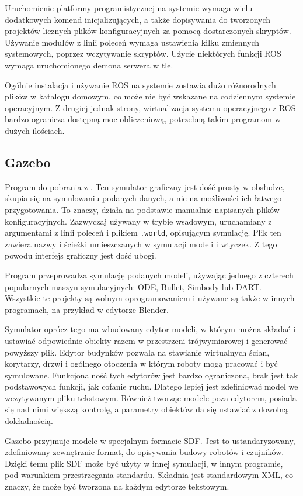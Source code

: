 	Uruchomienie platformy programistycznej na systemie wymaga wielu dodatkowych komend inicjalizujących, 
	a także dopisywania do tworzonych projektów licznych plików konfiguracyjnych za pomocą dostarczonych skryptów.
	Używanie modułów z linii poleceń wymaga ustawienia kilku zmiennych systemowych, poprzez wczytywanie skryptów.
	Użycie niektórych funkcji ROS wymaga uruchomionego demona serwera w tle.

	Ogólnie instalacja i używanie ROS na systemie zostawia dużo różnorodnych plików w katalogu domowym, co może nie być wskazane na codziennym systemie operacyjnym.
	Z drugiej jednak strony, wirtualizacja systemu operacyjnego z ROS bardzo ogranicza dostępną moc obliczeniową, potrzebną takim programom w dużych ilościach.

	\subsection{Gazebo}
		Program do pobrania z \cite{gazebo_website}. 
		Ten symulator graficzny jest dość prosty w obsłudze, skupia się na symulowaniu podanych danych, a nie na możliwości ich łatwego przygotowania.
		To znaczy, działa na podstawie manualnie napisanych plików konfiguracyjnych.
		Zazwyczaj używany w trybie wsadowym, uruchamiany z argumentami z linii poleceń i plikiem \texttt{.world}, opisującym symulację.
		Plik ten zawiera nazwy i ścieżki umieszczanych w symulacji modeli i wtyczek.
		Z tego powodu interfejs graficzny jest dość ubogi.

		Program przeprowadza symulację podanych modeli, używając jednego z czterech popularnych maszyn symulacyjnych: ODE, Bullet, Simbody lub DART.
		Wszystkie te projekty są wolnym oprogramowaniem i używane są także w innych programach, na przykład w edytorze Blender.

		Symulator oprócz tego ma wbudowany edytor modeli, w którym można składać i ustawiać odpowiednie obiekty razem w przestrzeni trójwymiarowej
		i generować powyższy plik.
		Edytor budynków pozwala na stawianie wirtualnych ścian, korytarzy, drzwi i ogólnego otoczenia w którym roboty mogą pracować i być symulowane.
		Funkcjonalność tych edytorów jest bardzo ograniczona, brak jest tak podstawowych funkcji, jak cofanie ruchu.
		Dlatego lepiej jest zdefiniować model we wczytywanym pliku tekstowym.
		Również tworząc modele poza edytorem, posiada się nad nimi większą kontrolę, a parametry obiektów da się ustawiać z dowolną dokładnością.

		Gazebo przyjmuje modele w specjalnym formacie SDF. Jest to ustandaryzowany, zdefiniowany zewnętrznie format, do opisywania budowy robotów i czujników.
		Dzięki temu plik SDF może być użyty w innej symulacji, w innym programie, pod warunkiem przestrzegania standardu.
		Składnia jest standardowym XML, co znaczy, że może być tworzona na każdym edytorze tekstowym.


